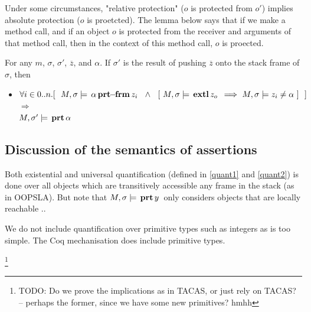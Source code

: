 Under some circumstances, "relative protection" ($o$ is protected from $o'$) implies absolute protection ($o$ is proetcted).
The lemma below says that if we make a method call, and if an object $o$ is protected from  the receiver and arguments of that method call, then in the context of this method call, $o$ is proected.
 
 
 
 \begin{lemma}
 \label{lemma:rel:abs:prot}
 For any $m$, $\sigma$, $\sigma'$, $\overline z$, and $\alpha$. If $\sigma'$ is the result of pushing $\overline z$ onto the stack frame of $\sigma$,  %
 then
 \begin{itemize}
 \item
  $\forall i\in 0..n.[\ \ \satisfiesA{M}{\sigma}{\protectedFrom {\alpha} {z_i} }  \ \ \wedge\ \ 
 [ \  \satisfiesA{M}{\sigma}{\external {z_o}} \ \Longrightarrow\   \satisfiesA{M}{\sigma} {z_i \neq {\alpha}}\ ] \ \  ] $
  \\
  $ \Longrightarrow$ \\
   $ M , \sigma' \models {\ensuremath{\, \mathbf{prt}}\, \alpha\, }$
 \end{itemize}
\end{lemma}
 
 \subsection{Discussion of the semantics of assertions}
 
 {Both existential and universal quantification (defined in \ref{quant1} and \ref{quant2}) is done over all objects which are transitively 
accessible any frame in the stack (as in OOPSLA). But note that $M , \sigma \models {\ensuremath{\, \mathbf{prt}}\, y\, }$ only considers objects that are locally reachable ..

We do not include quantification over primitive types such as integers as \LangOO is too simple. The 
Coq mechanisation does include primitive types.}
\footnote{TODO: Do we prove the implications as in TACAS, or just rely on TACAS? -- perhaps the former, since we have some new primitives? hmhh}

